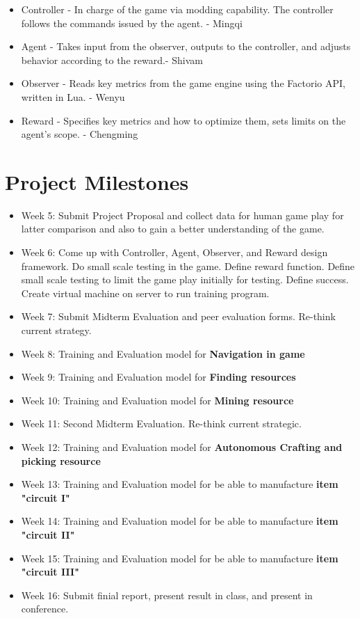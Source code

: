 \documentclass{article}
\begin{document}
\begin{itemize}
    \item  Controller - In charge of the game via modding capability. The controller follows the commands issued by the agent. - Mingqi
    \item  Agent - Takes input from the observer, outputs to the controller, and adjusts behavior according to the  reward.- Shivam
    \item  Observer - Reads key metrics from the game engine using the Factorio API, written in Lua. - Wenyu
    \item  Reward - Specifies key metrics and how to optimize them, sets limits on the agent’s scope. - Chengming
    
\end{itemize}
   
    
\section{Project Milestones}

\begin{itemize}
   \item Week 5: Submit Project Proposal and collect data for human game play for latter comparison and also to gain a better understanding of the game.
   \item Week 6: Come up with Controller, Agent, Observer, and Reward design framework. Do small scale testing in the game. Define reward function. Define small scale testing to limit the game play initially for testing. Define success. Create virtual machine on server to run training program.
   \item Week 7: Submit Midterm Evaluation and peer evaluation forms. Re-think current strategy. 
   \item Week 8: Training and Evaluation model for \textbf{Navigation in game}
   \item Week 9: Training and Evaluation model for \textbf{Finding resources}
   \item Week 10: Training and Evaluation model for \textbf{Mining resource}
   \item Week 11: Second Midterm Evaluation. Re-think current strategic. 
   \item Week 12: Training and Evaluation model for \textbf{Autonomous Crafting and picking resource}
   \item Week 13: Training and Evaluation model for be able to manufacture \textbf{item "circuit I"}
   \item Week 14: Training and Evaluation model for be able to manufacture \textbf{item "circuit II"}
   \item Week 15: Training and Evaluation model for be able to manufacture \textbf{item "circuit III"}
   \item Week 16: Submit finial report, present result in class, and present in conference.
    
\end{itemize}
\end{document}
